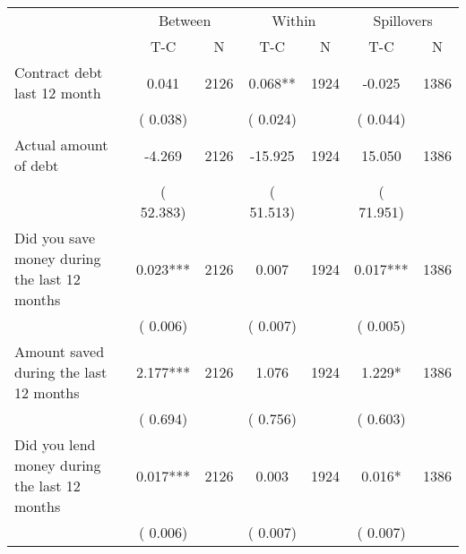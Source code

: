 
\begin{tabular}{l*{6}{c}}\hline&\multicolumn{2}{c}{Between}&\multicolumn{2}{c}{Within}&\multicolumn{2}{c}{Spillovers} \\ \cmidrule(r){2-3}\cmidrule(l){4-5}\cmidrule(l){6-7} & {T-C} & {N} & {T-C} & {N}  & {T-C}  & {N}  \\ \midrule
Contract debt last 12 month        &              0.041      &       2126       &              0.068**      &       1924       &             -0.025      &       1386       \\
                       &       (       0.038)            &                               &       (       0.024)            &                               &       (       0.044)            &                               \\
Actual amount of debt        &             -4.269      &       2126       &            -15.925      &       1924       &             15.050      &       1386       \\
                       &       (      52.383)            &                               &       (      51.513)            &                               &       (      71.951)            &                               \\
Did you save money during the last 12 months        &              0.023***      &       2126       &              0.007      &       1924       &              0.017***      &       1386       \\
                       &       (       0.006)            &                               &       (       0.007)            &                               &       (       0.005)            &                               \\
Amount saved during the last 12 months        &              2.177***      &       2126       &              1.076      &       1924       &              1.229*      &       1386       \\
                       &       (       0.694)            &                               &       (       0.756)            &                               &       (       0.603)            &                               \\
Did you lend money during the last 12 months        &              0.017***      &       2126       &              0.003      &       1924       &              0.016*      &       1386       \\
                       &       (       0.006)            &                               &       (       0.007)            &                               &       (       0.007)            &                               \\
\hline \end{tabular}